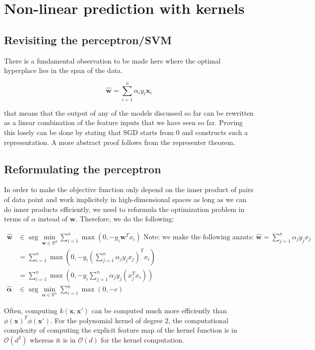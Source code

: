 \documentclass[a4paper,10pt,twoside]{article}
\begin{document}
\section{Non-linear prediction with kernels}

\subsection{Revisiting the perceptron/SVM}

There is a fundamental observation to be made here where the optimal hyperplace lies in the span of the data.

\begin{equation*}
    \mathbf{\hat{w}}=\sum_{i=1}^{n}\alpha_iy_i\mathbf{x}_i
\end{equation*}

that means that the output of any of the models discussed so far can be rewritten as a linear combination of the feature inputs that we have seen so far. Proving this losely can be done by stating that SGD starts from 0 and constructs such a representation. A more abstract proof follows from the representer theorem.

\subsection{Reformulating the perceptron}

In order to make the objective function only depend on the inner product of pairs of data point and work implicitely in high-dimensional spaces as long as we can do inner products efficiently, we need to reformula the optimization problem in terms of $\alpha$ instead of $\mathbf{w}$. Therefore, we do the following:

\begin{align*}
    \hat{\mathbf{w}}&\in\arg\min_{\mathbf{w}\in\mathbb{R}^d}\sum_{i=1}^{n}\max(0,-y_i\mathbf{w}^Tx_i)\text{ Note: we make the following anzats: }\hat{\mathbf{w}}=\sum_{j=1}^{n}\alpha_jy_jx_j\\
    &= \sum_{i=1}^{n}\max(0,-y_i(\sum_{j=1}^{n}\alpha_jy_jx_j)^Tx_i)\\
    &= \sum_{i=1}^{n}\max(0,-y_i\sum_{j=1}^{n}\alpha_jy_j(x_j^Tx_i))\\
    \hat{\mathbf{\alpha}}&\in\arg\min_{\mathbf{\alpha}\in\mathbb{R}^n}\sum_{i=1}^{n}\max(0,-c)
\end{align*}

Often, computing $k(\mathbf{x}, \mathbf{x}')$ can be computed much more efficiently than $\phi(\mathbf{x})^T\phi(\mathbf{x}')$. For the polynomial kernel of degree 2, the computational complexity of computing the explicit feature map of the kernel function is in $\mathcal{O}(d^2)$ whereas it is in $\mathcal{O}(d)$ for the kernel computation.
\end{document}
